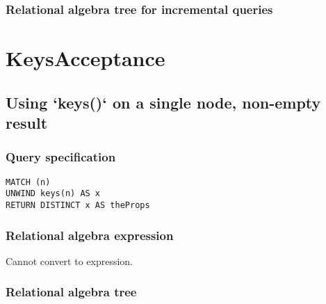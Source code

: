 \subsubsection*{Relational algebra tree for incremental queries}


\section{KeysAcceptance}

\subsection{Using `keys()` on a single node, non-empty result}

\subsubsection*{Query specification}

\begin{lstlisting}
MATCH (n)
UNWIND keys(n) AS x
RETURN DISTINCT x AS theProps
\end{lstlisting}

\subsubsection*{Relational algebra expression}

Cannot convert to expression.

\subsubsection*{Relational algebra tree}

